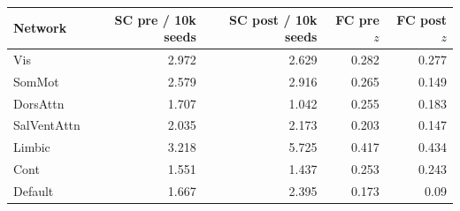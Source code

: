 \begin{tabular}{lrrrr}
\toprule
Network & SC pre / 10k seeds & SC post / 10k seeds & FC pre $z$ & FC post $z$ \\
\midrule
Vis & 2.972 & 2.629 & 0.282 & 0.277 \\
SomMot & 2.579 & 2.916 & 0.265 & 0.149 \\
DorsAttn & 1.707 & 1.042 & 0.255 & 0.183 \\
SalVentAttn & 2.035 & 2.173 & 0.203 & 0.147 \\
Limbic & 3.218 & 5.725 & 0.417 & 0.434 \\
Cont & 1.551 & 1.437 & 0.253 & 0.243 \\
Default & 1.667 & 2.395 & 0.173 & 0.09 \\
\bottomrule
\end{tabular}
